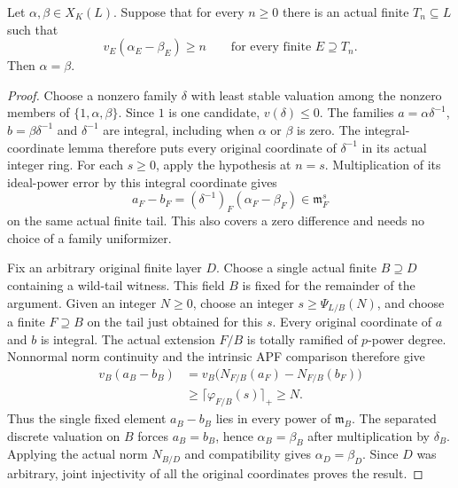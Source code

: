 \begin{lemma}
\label{fw:norm-limit-asymptotic-separation}
\leanok
Let $\alpha,\beta\in X_K(L)$. Suppose that for every $n\geq0$
there is an actual finite $T_n\subseteq L$ such that
\[
 v_E(\alpha_E-\beta_E)\geq n
 \qquad\text{for every finite }E\supseteq T_n.
\]
Then $\alpha=\beta$.
\end{lemma}
\begin{proof}
Choose a nonzero family $\delta$ with least stable valuation among
the nonzero members of $\{1,\alpha,\beta\}$. Since $1$ is one
candidate, $v(\delta)\leq0$. The families
$a=\alpha\delta^{-1}$, $b=\beta\delta^{-1}$ and $\delta^{-1}$
are integral, including when $\alpha$ or $\beta$ is zero.
The integral-coordinate lemma therefore puts every original
coordinate of $\delta^{-1}$ in its actual integer ring.
For each $s\geq0$, apply the hypothesis at $n=s$.
Multiplication of its ideal-power error by this integral coordinate
gives
\[
 a_F-b_F=(\delta^{-1})_F(\alpha_F-\beta_F)
 \in\mathfrak m_F^s
\]
on the same actual finite tail. This also covers a zero difference
and needs no choice of a family uniformizer.

Fix an arbitrary original finite layer $D$. Choose a single actual
finite $B\supseteq D$ containing a wild-tail witness. This field $B$
is fixed for the remainder of the argument. Given an integer $N\geq0$,
choose an integer $s\geq\Psi_{L/B}(N)$, and choose a finite
$F\supseteq B$ on the tail just obtained for this $s$.
Every original coordinate of $a$ and $b$ is integral.
The actual extension $F/B$ is totally ramified of $p$-power degree.
Nonnormal norm continuity and the intrinsic APF comparison therefore give
\[
 \begin{split}
 v_B(a_B-b_B)
 &=v_B\bigl(N_{F/B}(a_F)-N_{F/B}(b_F)\bigr)\\
 &\geq\lceil\varphi_{F/B}(s)\rceil_+\geq N.
 \end{split}
\]
Thus the single fixed element $a_B-b_B$ lies in every power of
$\mathfrak m_B$. The separated discrete valuation on $B$ forces
$a_B=b_B$, hence $\alpha_B=\beta_B$ after multiplication by $\delta_B$.
Applying the actual norm $N_{B/D}$ and compatibility gives
$\alpha_D=\beta_D$. Since $D$ was arbitrary, joint injectivity of
all the original coordinates proves the result.
\end{proof}

